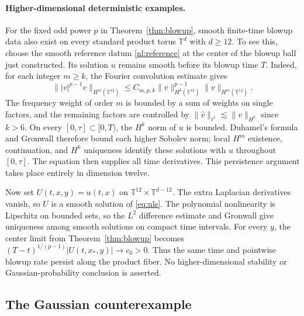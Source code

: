 \paragraph{Higher-dimensional deterministic examples.}
For the fixed odd power $p$ in Theorem~\ref{thm:blowup}, smooth
finite-time blowup data also exist on every standard product torus
$\mathbb T^d$ with $d\ge12$. To see this, choose the smooth reference
datum \eqref{nl:reference} at the center of the blowup ball just
constructed. Its solution $u$ remains smooth before its blowup time $T$.
Indeed, for each integer $m\ge k$, the Fourier convolution estimate gives
\[
 \big\||v|^{p-1}v\big\|_{H^m(\mathbb T^{12})}
 \le C_{m,p,k}\|v\|_{H^k(\mathbb T^{12})}^{p-1}
                 \|v\|_{H^m(\mathbb T^{12})}.
\]
The frequency weight of order $m$ is bounded by a sum of weights on
single factors, and the remaining factors are controlled by
$\|\widehat v\|_{\ell^1}\lesssim\|v\|_{H^k}$ since $k>6$.
On every $[0,\tau]\subset[0,T)$, the $H^k$ norm of $u$ is bounded.
Duhamel's formula and Gronwall therefore bound each higher Sobolev norm;
local $H^m$ existence, continuation, and $H^k$ uniqueness identify these
solutions with $u$ throughout $[0,\tau]$. The equation then supplies all
time derivatives. This persistence argument takes place entirely in
dimension twelve.

Now set $U(t,x,y)=u(t,x)$ on
$\mathbb T^{12}\times\mathbb T^{d-12}$. The extra Laplacian derivatives
vanish, so $U$ is a smooth solution of \eqref{eq:nls}.
The polynomial nonlinearity is Lipschitz on bounded sets, so the $L^2$
difference estimate and Gronwall give uniqueness among smooth solutions
on compact time intervals.
For every $y$, the center limit from Theorem~\ref{thm:blowup} becomes
$(T-t)^{1/(p-1)}|U(t,x_*,y)|\to c_0>0$.
Thus the same time and pointwise blowup rate persist along the product
fiber. No higher-dimensional stability or Gaussian-probability conclusion
is asserted.

\subsection{The Gaussian counterexample}

